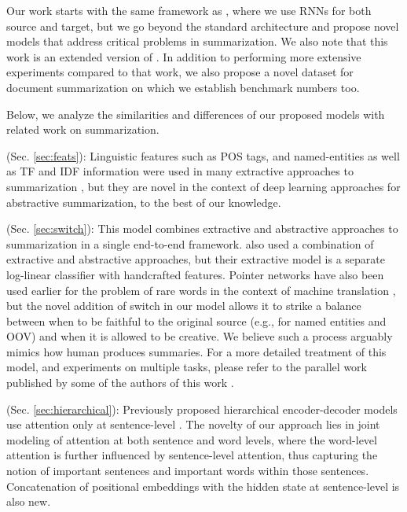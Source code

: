 \documentclass[11pt]{article}
\begin{document}
Our work starts with the same framework as \cite{hu:2015:EMNLP}, where we use RNNs for both source and target, but we go beyond the standard architecture and propose novel models that address critical problems in summarization. We also note that this work is an extended version of . In addition to performing more extensive experiments compared to that work, we also propose a novel dataset for document summarization on which we establish benchmark numbers too.

Below, we analyze the similarities and differences of our proposed models with related work on summarization.

 (Sec. \ref{sec:feats}): Linguistic features such as POS tags, and named-entities as well as TF and IDF information were used in many extractive approaches to summarization \cite{linguistic_extractive}, but they are novel in the context of deep learning approaches for abstractive summarization, to the best of our knowledge.

 (Sec. \ref{sec:switch}): This model combines extractive and abstractive approaches to summarization in a single end-to-end framework.  also used a combination of extractive and abstractive approaches, but their extractive model is a separate log-linear classifier with handcrafted features. Pointer networks \cite{pointer_networks} have also been used earlier for the problem of rare words in the context of machine translation \cite{luongACL15}, but the novel addition of switch in our model allows it to strike a balance between when to be faithful to the original source (e.g., for named entities and OOV) and when it is allowed to be creative. We believe such a process arguably mimics how human produces summaries. For a more detailed treatment of this model, and experiments on multiple tasks, please refer to the parallel work published by some of the authors of this work \cite{caglar_acl}.

 (Sec. \ref{sec:hierarchical}): Previously proposed hierarchical encoder-decoder models use attention only at sentence-level \cite{hiero_encdec}. The novelty of our approach lies in joint modeling of attention at both sentence and word levels, where the word-level attention is further influenced by sentence-level attention, thus capturing the notion of important sentences and important words within those sentences. Concatenation of positional embeddings with the hidden state at sentence-level is also new.
\end{document}
